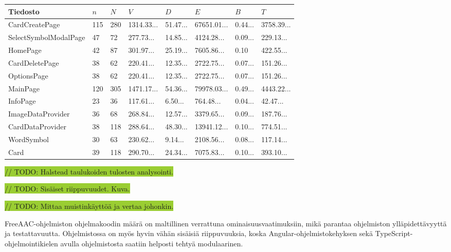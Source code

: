 \documentclass[utf8]{gradu3}
\begin{document}
\begin{center}
    \begin{tabular}{| l | l | l | l | l | l | l | l |}
    \hline
    \textbf{Tiedosto} & \textbf{$n$} & \textbf{$N$} & \textbf{$V$} & \textbf{$D$} & \textbf{$E$} & \textbf{$B$} & \textbf{$T$} \\ \hline
    CardCreatePage & 115 & 280 & 1314.33... & 51.47... & 67651.01... & 0.44... & 3758.39... \\ \hline
    SelectSymbolModalPage & 47 & 72 & 277.73... & 14.85... & 4124.28... & 0.09... & 229.13... \\ \hline
    HomePage & 42 & 87 & 301.97... & 25.19... & 7605.86... & 0.10 & 422.55... \\ \hline
    CardDeletePage & 38 & 62 & 220.41... & 12.35... & 2722.75... & 0.07... & 151.26...   \\ \hline
    OptionsPage & 38 & 62 & 220.41... & 12.35... & 2722.75... & 0.07... & 151.26...  \\ \hline
    MainPage & 120 & 305 & 1471.17... & 54.36... & 79978.03... & 0.49... & 4443.22...  \\ \hline
    InfoPage & 23 & 36 & 117.61... & 6.50... & 764.48... & 0.04... & 42.47...  \\ \hline
    ImageDataProvider & 36 & 68 & 268.84... & 12.57... & 3379.65... & 0.09... & 187.76... \\ \hline
    CardDataProvider & 38 & 118 & 288.64... & 48.30... & 13941.12... & 0.10... & 774.51...  \\ \hline
    WordSymbol & 30 & 63 & 230.62... & 9.14... & 2108.56... & 0.08... & 117.14...  \\ \hline
    Card & 39 & 118 & 290.70... & 24.34... & 7075.83... & 0.10... & 393.10...  \\ \hline
    \end{tabular}
\end{center}

\colorbox{YellowGreen}{// TODO: Halstead taulukoiden tulosten analysointi.}

\colorbox{YellowGreen}{// TODO: Sisäiset riippuvuudet. Kuva.}

\colorbox{YellowGreen}{// TODO: Mittaa muistinkäyttöä ja vertaa johonkin.}

FreeAAC-ohjelmiston ohjelmakoodin määrä on maltillinen verrattuna ominaisuusvaatimuksiin, mikä parantaa ohjelmiston ylläpidettävyyttä ja testattavuutta. Ohjelmistossa on myös hyvin vähän sisäisiä riippuvuuksia, koska Angular-ohjelmistokehyksen sekä TypeScript-ohjelmointikielen avulla ohjelmistosta saatiin helposti tehtyä modulaarinen. 
\end{document}
